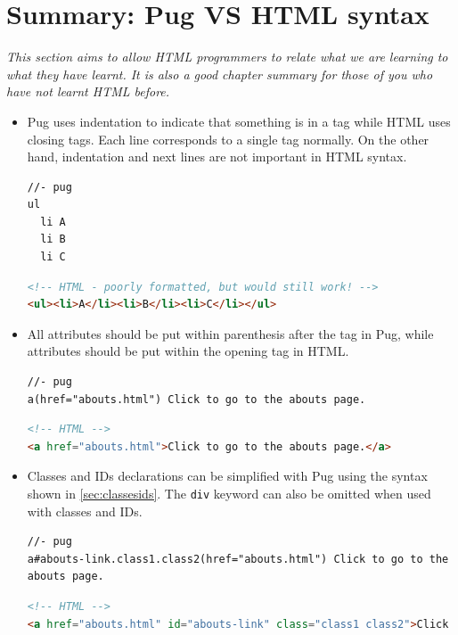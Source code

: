 \newpage
\section{Summary: Pug VS HTML syntax}
\label{sec:pugvshtml}

\textit{This section aims to allow HTML programmers to relate what we are learning to what they have learnt. It is also a good chapter summary for those of you who have not learnt HTML before.}
\vspace{6mm}

\begin{itemize}
\item Pug uses indentation to indicate that something is in a tag while HTML uses closing tags. Each line corresponds to a single tag normally. On the other hand, indentation and next lines are not important in HTML syntax.
\vspace{6mm}

\begin{lstlisting}[language=pug]
//- pug
ul
  li A
  li B
  li C
\end{lstlisting}

\begin{lstlisting}[language=html]
<!-- HTML - poorly formatted, but would still work! -->
<ul><li>A</li><li>B</li><li>C</li></ul>
\end{lstlisting}

\item All attributes should be put within parenthesis after the tag in Pug, while attributes should be put within the opening tag in HTML.
\vspace{6mm}

\begin{lstlisting}[language=pug]
//- pug
a(href="abouts.html") Click to go to the abouts page.
\end{lstlisting}

\begin{lstlisting}[language=html]
<!-- HTML -->
<a href="abouts.html">Click to go to the abouts page.</a>
\end{lstlisting}

\item Classes and IDs declarations can be simplified with Pug using the syntax shown in \cref{sec:classesids}. The \texttt{div} keyword can also be omitted when used with classes and IDs.
\vspace{6mm}

\begin{lstlisting}[language=pug]
//- pug
a#abouts-link.class1.class2(href="abouts.html") Click to go to the abouts page.
\end{lstlisting}

\begin{lstlisting}[language=html]
<!-- HTML -->
<a href="abouts.html" id="abouts-link" class="class1 class2">Click to go to the abouts page.</a>
\end{lstlisting}

\end{itemize}
